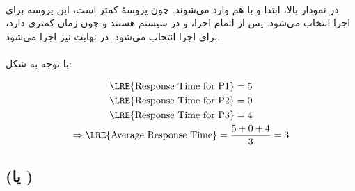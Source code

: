 \documentclass{article}
\begin{document}
	\begin{latin}
	\end{latin}

	\paragraph*{}
	در نمودار بالا، ابتدا
	و
	با هم وارد می‌شوند. چون
	پروسهٔ
	کمتر است، این پروسه برای اجرا انتخاب می‌شود. پس از اتمام اجرا،
	و
	در سیستم هستند و چون
	زمان
	کمتری دارد، برای اجرا انتخاب می‌شود. در نهایت
	نیز اجرا می‌شود.

	\paragraph*{}
	با توجه به شکل:

	\begin{gather*}
		\textrm{\LRE{Response Time for P1}} = 5 \\
		\textrm{\LRE{Response Time for P2}} = 0 \\
		\textrm{\LRE{Response Time for P3}} = 4 \\
		\Rightarrow
		\textrm{\LRE{Average Response Time}} =
		\frac{5 + 0 + 4}{3} = 3
	\end{gather*}

	\subsection*{ (یا )}

	\begin{latin}
	\end{latin}
\end{document}
